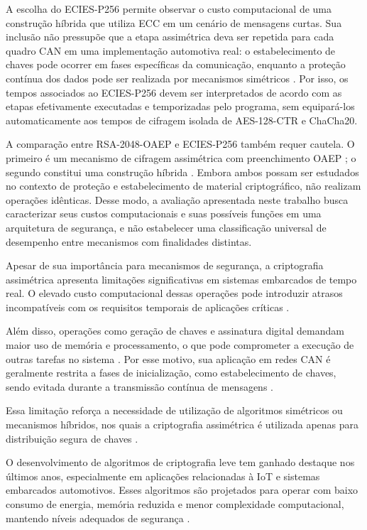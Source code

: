 A escolha do ECIES-P256 permite observar o custo computacional de uma construção híbrida que utiliza ECC em um cenário de mensagens curtas. Sua inclusão não pressupõe que a etapa assimétrica deva ser repetida para cada quadro CAN em uma implementação automotiva real: o estabelecimento de chaves pode ocorrer em fases específicas da comunicação, enquanto a proteção contínua dos dados pode ser realizada por mecanismos simétricos \cite{mundhenk2017security}. Por isso, os tempos associados ao ECIES-P256 devem ser interpretados de acordo com as etapas efetivamente executadas e temporizadas pelo programa, sem equipará-los automaticamente aos tempos de cifragem isolada de AES-128-CTR e ChaCha20.

A comparação entre RSA-2048-OAEP e ECIES-P256 também requer cautela. O primeiro é um mecanismo de cifragem assimétrica com preenchimento OAEP \cite{rfc8017}; o segundo constitui uma construção híbrida \cite{ieee1363a2004}. Embora ambos possam ser estudados no contexto de proteção e estabelecimento de material criptográfico, não realizam operações idênticas. Desse modo, a avaliação apresentada neste trabalho busca caracterizar seus custos computacionais e suas possíveis funções em uma arquitetura de segurança, e não estabelecer uma classificação universal de desempenho entre mecanismos com finalidades distintas.

Apesar de sua importância para mecanismos de segurança, a criptografia assimétrica apresenta limitações significativas em sistemas embarcados de tempo real. O elevado custo computacional dessas operações pode introduzir atrasos incompatíveis com os requisitos temporais de aplicações críticas \cite{gaubatz2004public}.

Além disso, operações como geração de chaves e assinatura digital demandam maior uso de memória e processamento, o que pode comprometer a execução de outras tarefas no sistema \cite{qazi2021security}. Por esse motivo, sua aplicação em redes CAN é geralmente restrita a fases de inicialização, como estabelecimento de chaves, sendo evitada durante a transmissão contínua de mensagens \cite{luo2021can}.

Essa limitação reforça a necessidade de utilização de algoritmos simétricos ou mecanismos híbridos, nos quais a criptografia assimétrica é utilizada apenas para distribuição segura de chaves \cite{hammi2018bubbles}.

O desenvolvimento de algoritmos de criptografia leve tem ganhado destaque nos últimos anos, especialmente em aplicações relacionadas à IoT e sistemas embarcados automotivos. Esses algoritmos são projetados para operar com baixo consumo de energia, memória reduzida e menor complexidade computacional, mantendo níveis adequados de segurança \cite{beaulieu2015simon}.

